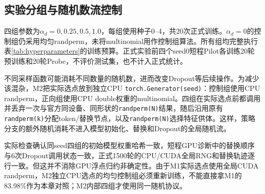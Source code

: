 \subsection{实验分组与随机数流控制}
四组参数为$\alpha_d=0,0.25,0.5,1.0$，每组使用种子0--4，共20次正式训练。$\alpha_d=0$的控制组仍采用均匀randperm，未将multinomial用作控制组算法。所有组均完整执行表\ref{tab:hyperparameters}的训练预算。正式实验前四个seed0短程Pilot各训练20轮预训练和20轮Probe，不评价测试集，也不计入正式统计。

不同采样函数可能消耗不同数量的随机数，进而改变Dropout等后续操作。为减少该混杂，M2把实际选点放到独立CPU \texttt{torch.Generator(seed)}：控制组使用CPU randperm，正向组使用CPU double权重的multinomial。四组在实际选点前都调用并丢弃一次与官方同设备、同形状的\texttt{randperm(N)}结果，随后沿用原有\texttt{randperm(k)}分配token/替换节点，以及\texttt{randperm(N)}选择特征供体。这样，策略分支的额外随机消耗不进入模型初始化、替换和Dropout的全局随机流。

实际检查确认同seed四组的初始模型权重哈希一致，短程GPU诊断中的替换顺序与6次Dropout调用状态一致，正式1500轮的CPU/CUDA全局RNG和替换轨迹逐行一致。但这并不消除GPU浮点归约非确定性。由于M1实际选点使用全局CUDA randperm，M2独立CPU选点的均匀控制组必须重新训练，不能直接拿M1的83.98\%作为本章对照；M2内部四组才使用同一随机协议。

